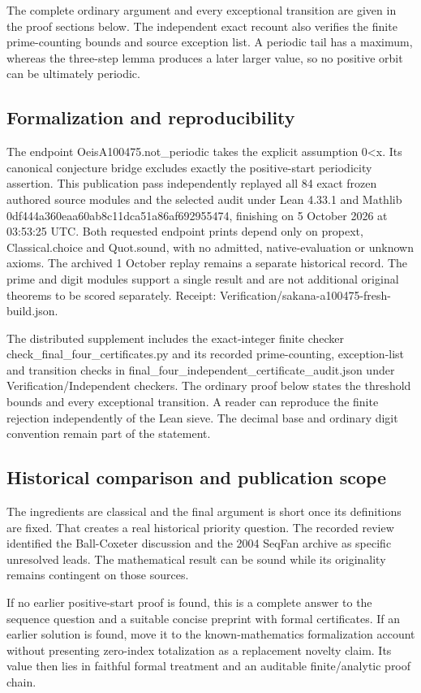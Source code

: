 \documentclass[11pt,a4paper]{article}
\begin{document}
The complete ordinary argument and every exceptional transition are given in the proof sections below. The independent exact recount also verifies the finite prime-counting bounds and source exception list. A periodic tail has a maximum, whereas the three-step lemma produces a later larger value, so no positive orbit can be ultimately periodic.

\subsection{Formalization and reproducibility}
The endpoint OeisA100475.not\_periodic takes the explicit assumption 0<x. Its canonical conjecture bridge excludes exactly the positive-start periodicity assertion. This publication pass independently replayed all 84 exact frozen authored source modules and the selected audit under Lean 4.33.1 and Mathlib 0df444a360eaa60ab8c11dca51a86af692955474, finishing on 5 October 2026 at 03:53:25 UTC. Both requested endpoint prints depend only on propext, Classical.choice and Quot.sound, with no admitted, native-evaluation or unknown axioms. The archived 1 October replay remains a separate historical record. The prime and digit modules support a single result and are not additional original theorems to be scored separately. Receipt: Verification/sakana-a100475-fresh-build.json.

The distributed supplement includes the exact-integer finite checker check\_final\_four\_certificates.py and its recorded prime-counting, exception-list and transition checks in final\_four\_independent\_certificate\_audit.json under Verification/Independent checkers. The ordinary proof below states the threshold bounds and every exceptional transition. A reader can reproduce the finite rejection independently of the Lean sieve. The decimal base and ordinary digit convention remain part of the statement.

\subsection{Historical comparison and publication scope}
The ingredients are classical and the final argument is short once its definitions are fixed. That creates a real historical priority question. The recorded review identified the Ball-Coxeter discussion and the 2004 SeqFan archive as specific unresolved leads. The mathematical result can be sound while its originality remains contingent on those sources.

If no earlier positive-start proof is found, this is a complete answer to the sequence question and a suitable concise preprint with formal certificates. If an earlier solution is found, move it to the known-mathematics formalization account without presenting zero-index totalization as a replacement novelty claim. Its value then lies in faithful formal treatment and an auditable finite/analytic proof chain.
\end{document}
